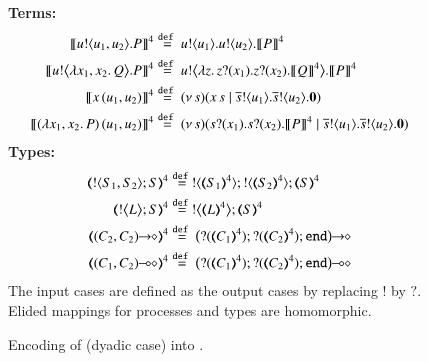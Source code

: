 
\begin{figure}[t]
{\bf Terms:} 
\begin{align*}
	 \map{\bout{u}{u_1, u_2} P}^{4} &\defeq \bout{u}{u_1} \bout{u}{u_2} \map{P}^{4}
	\\
	 \map{\bbout{u}{\abs{x_1, x_2} Q} P}^{4} &\defeq \bbout{u}{\abs{z}\binp{z}{x_1} \binp{z}{x_2} \map{Q}^{4}} \map{P}^{4} %
	\\
 \map{\appl{x}{(u_1, u_2)}}^{4} &\defeq \newsp{s}{\appl{x}{s} \Par \bout{\dual{s}}{u_1}   \bout{\dual{s}}{u_2} \inact}
	\\
	\map{\appl{(\abs{x_1,x_2}{P})}{(u_1, u_2)}}^{4} &\defeq
	\newsp{s}{\binp{s}{x_1}  \binp{s}{x_2} \pmap{P}{4} \Par \bout{\dual{s}}{u_1}  \bout{\dual{s}}{u_2} \inact} 
\end{align*}
{\bf Types:}
\begin{align*}
		\tmap{\btout{S_1, S_2}S}{4} &\defeq \btout{\tmap{S_1}{4}}  \btout{\tmap{S_2}{4}}\tmap{S}{4}
	\\
	 \tmap{\bbtout{L} S}{4} & \defeq  \bbtout{\mapt{L}^{4}}\mapt{S}^{4}
	\\
	  \tmap{\shot{(C_2,  C_2)}}{4} &\defeq \shot{\big(\btinp{\tmap{C_1}{4}} \btinp{\tmap{C_2}{4}}\tinact\big)}
	\\
	  \tmap{\lhot{(C_1,  C_2)}}{4} &\defeq \lhot{\big(\btinp{\tmap{C_1}{4}}  \btinp{\tmap{C_2}{4}}\tinact\big)}
\end{align*}
The input cases are defined as the output cases by replacing $!$ by $?$. 
Elided mappings for  processes and types are 
homomorphic.
\caption{\label{f:enc:poltomon}Encoding of \PHOp (dyadic case) into \HOp. }
\end{figure}

